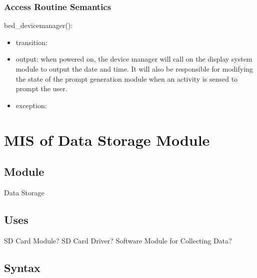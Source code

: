 \documentclass[12pt, titlepage]{article}
\begin{document}
\subsubsection{Access Routine Semantics}

\noindent bed\_devicemanager():
\begin{itemize}
\item transition:   
\item output: when powered on, the device manager will call on the display system module to output the date and time. It will also be responsible for modifying the state of the prompt generation module when an activity is sensed to prompt the user. %
\item exception:  
\end{itemize}



\newpage




\section{MIS of Data Storage Module} \label{mDS_1} 

\subsection{Module}

Data Storage

\subsection{Uses}

SD Card Module? SD Card Driver? Software Module for Collecting Data?   %

\subsection{Syntax}
\end{document}
